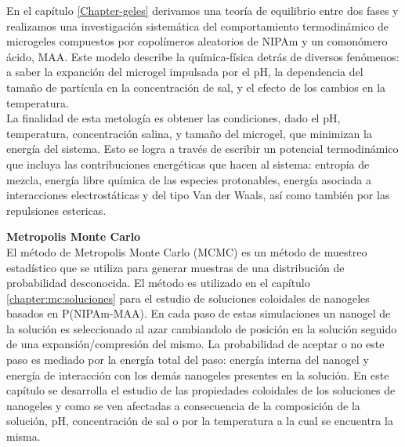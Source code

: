 En el cap\'itulo \ref{Chapter-geles} derivamos una teor\'ia de equilibrio entre dos fases y realizamos una investigaci\'on sistem\'atica del comportamiento termodin\'amico de microgeles compuestos por copol\'imeros aleatorios de NIPAm y un comon\'omero \'acido, MAA. Este modelo describe la qu\'imica-f\'isica detr\'as de diversos fen\'omenos: a saber la expanci\'on del microgel impulsada por el pH, la dependencia del tama\~no de part\'icula en la concentraci\'on de sal, y el efecto de los cambios en la temperatura.\\ La finalidad de esta metolog\'ia es obtener las condiciones, dado el pH, temperatura, concentraci\'on salina, y tama\~no del microgel, que minimizan la energ\'ia  del sistema. Esto se logra a  trav\'es de escribir un potencial termodin\'amico que incluya las contribuciones energ\'eticas que hacen al sistema: entrop\'ia de mezcla, energ\'ia libre qu\'imica de las especies protonables, energ\'ia asociada a interacciones electrost\'aticas y del tipo Van der Waals, as\'i  como tambi\'en por las repulsiones estericas.  




\textbf{Metropolis Monte Carlo}\\

El m\'etodo de Metropolis Monte Carlo (MCMC) es un m\'etodo de muestreo estad\'istico que se utiliza para generar muestras de una distribuci\'on de probabilidad desconocida. El m\'etodo es utilizado en el cap\'itulo \ref{chapter:mc:soluciones} para el estudio de soluciones coloidales de nanogeles basados en P(NIPAm-MAA). En cada paso de estas simulaciones un nanogel de la soluci\'on es seleccionado al azar cambiandolo de posici\'on en la soluci\'on seguido de una expansi\'on/compresi\'on del mismo.
La probabilidad de aceptar o no este paso es mediado por la energ\'ia total del paso: energ\'ia interna del nanogel y energ\'ia de interacci\'on con los dem\'as nanogeles presentes en la soluci\'on.
En este cap\'itulo se desarrolla el estudio de las propiedades coloidales de los soluciones de nanogeles y como se ven afectadas a consecuencia de la composici\'on de la soluci\'on, pH, concentraci\'on de sal o por la temperatura a la cual se encuentra la misma.





